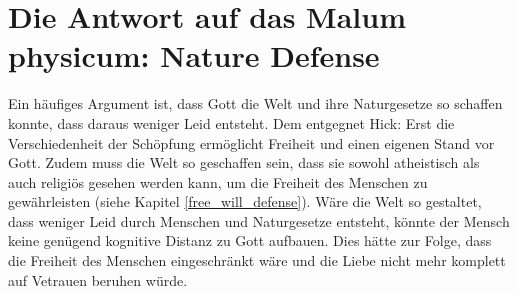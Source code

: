 \section{Die Antwort auf das Malum physicum: Nature Defense} \label{nature_defense}
Ein häufiges Argument ist, dass Gott die Welt und ihre Naturgesetze so schaffen konnte, dass daraus weniger Leid entsteht. Dem entgegnet Hick: Erst die Verschiedenheit der Schöpfung ermöglicht Freiheit und einen eigenen Stand vor Gott. Zudem muss die Welt so geschaffen sein, dass sie sowohl atheistisch als auch religiös gesehen werden kann, um die Freiheit des Menschen zu gewährleisten (siehe Kapitel \ref{free_will_defense}). Wäre die Welt so gestaltet, dass weniger Leid durch Menschen und Naturgesetze entsteht, könnte der Mensch keine genügend kognitive Distanz zu Gott aufbauen. Dies hätte zur Folge, dass die Freiheit des Menschen eingeschränkt wäre und die Liebe nicht mehr komplett auf Vetrauen beruhen würde. 

